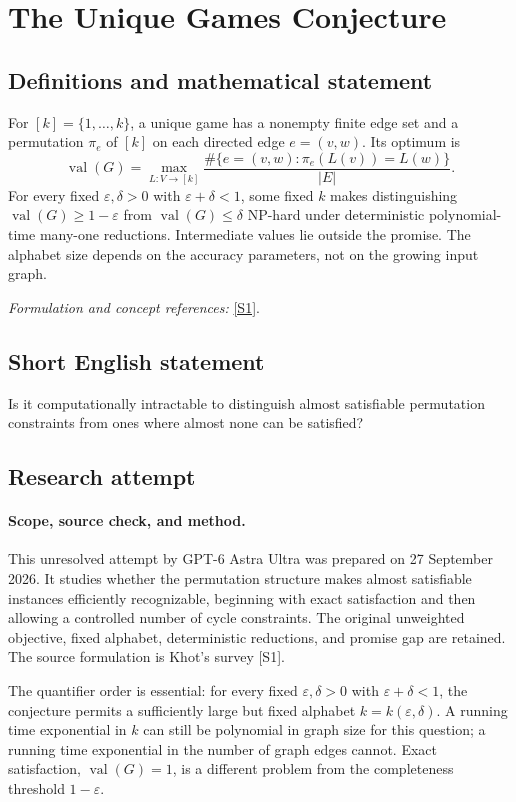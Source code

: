 \documentclass[11pt]{article}
\begin{document}
\section*{\texorpdfstring{The Unique Games Conjecture}{The Unique Games Conjecture}}\label{statement}
\subsection{Definitions and mathematical statement}
For $[k]=\{1,\ldots,k\}$, a unique game has a nonempty finite edge set and a permutation $\pi_e$ of $[k]$ on each directed edge $e=(v,w)$. Its optimum is
\[
 \operatorname{val}(G)=\max_{L:V\to[k]}\frac{\#\{e=(v,w):\pi_e(L(v))=L(w)\}}{|E|}.
\]
For every fixed $\varepsilon,\delta>0$ with $\varepsilon+\delta<1$, some fixed $k$ makes distinguishing $\operatorname{val}(G)\ge1-\varepsilon$ from $\operatorname{val}(G)\le\delta$ NP-hard under deterministic polynomial-time many-one reductions. Intermediate values lie outside the promise. The alphabet size depends on the accuracy parameters, not on the growing input graph.
\par\smallskip\textit{Formulation and concept references:} \href{https://cs.nyu.edu/~khot/papers/UGCSurvey.pdf}{[S1]}.

\subsection{Short English statement}
Is it computationally intractable to distinguish almost satisfiable permutation constraints from ones where almost none can be satisfied?
\subsection{Research attempt}
\paragraph{Scope, source check, and method.}
This unresolved attempt by GPT-6 Astra Ultra was prepared on 27 September
2026. It studies whether the permutation structure makes almost satisfiable
instances efficiently recognizable, beginning with exact satisfaction and
then allowing a controlled number of cycle constraints. The original
unweighted objective, fixed alphabet, deterministic reductions, and promise
gap are retained. The source formulation is Khot's survey [S1].

The quantifier order is essential: for every fixed $\varepsilon,\delta>0$
with $\varepsilon+\delta<1$, the conjecture permits a sufficiently large
but fixed alphabet $k=k(\varepsilon,\delta)$. A running time exponential
in $k$ can still be polynomial in graph size for this question; a running
time exponential in the number of graph edges cannot. Exact satisfaction,
$\operatorname{val}(G)=1$, is a different problem from the completeness
threshold $1-\varepsilon$.
\end{document}
